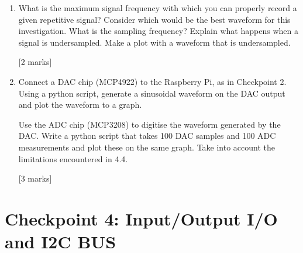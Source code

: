 \begin{enumerate}
\hfill [2 marks] \\

\item[3.4.]	What is the maximum signal frequency with which you can properly record a given repetitive signal?  Consider which would be the best waveform for this investigation. What is the sampling frequency? Explain what happens when a signal is undersampled. Make a plot with a waveform that is undersampled.   

\hfill [2 marks] \\

\item [3.5.] Connect a DAC chip (MCP4922) to the Raspberry Pi, as in Checkpoint 2.  Using a python script, generate a sinusoidal waveform on the DAC output and plot the waveform to a graph.

Use the ADC chip (MCP3208) to digitise the waveform generated by the DAC. Write a python script that takes 100 DAC samples and 100 ADC measurements and plot these on the same graph. Take into account the limitations encountered in 4.4.                                                          
 
\hfill [3 marks] 

\end{enumerate}


\newpage
\section{Checkpoint 4: Input/Output I/O and I2C BUS}

